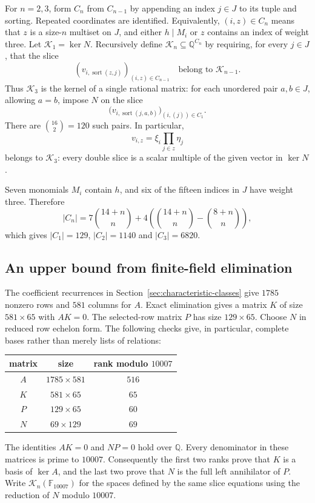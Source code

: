 For $n=2,3$, form $C_n$ from $C_{n-1}$ by appending an index $j\in J$
to its tuple and sorting. Repeated coordinates are identified.
Equivalently, $(i,z)\in C_n$ means that $z$ is a size-$n$ multiset
on $J$, and either $h\mid M_i$ or $z$ contains an index of weight
three. Let $\mathcal K_1=\ker N$. Recursively define
$\mathcal K_n\subseteq\mathbb Q^{C_n}$ by requiring, for every
$j\in J$, that the slice
\[
 (v_{i,\operatorname{sort}(z,j)})_{(i,z)\in C_{n-1}}
 \quad\text{belong to }\mathcal K_{n-1}.
\]
Thus $\mathcal K_3$ is the kernel of a single rational matrix:
for each unordered pair $a,b\in J$, allowing $a=b$, impose $N$ on the slice
\[
 \bigl(v_{i,\operatorname{sort}(j,a,b)}\bigr)_{(i,(j))\in C_1}.
\]
There are $\binom{16}{2}=120$ such pairs. In particular,
\begin{equation}\label{eq:geometric-cubic-column}
 v_{i,z}=\xi_i\prod_{j\in z}\eta_j
\end{equation}
belongs to $\mathcal K_3$: every double slice is a scalar multiple
of the given vector in $\ker N$.

Seven monomials $M_i$ contain $h$, and six of the fifteen indices
in $J$ have weight three. Therefore
\[
 |C_n|=7\binom{14+n}{n}
       +4\left(\binom{14+n}{n}-\binom{8+n}{n}\right),
\]
which gives $|C_1|=129$, $|C_2|=1140$ and $|C_3|=6820$.

\subsection{An upper bound from finite-field elimination}

The coefficient recurrences in Section~\ref{sec:characteristic-classes}
give $1785$ nonzero rows and $581$ columns for $A$. Exact elimination
gives a matrix $K$ of size $581\times65$ with $AK=0$.
The selected-row matrix $P$ has size $129\times65$. Choose $N$ in
reduced row echelon form. The following checks give, in particular,
complete bases rather than merely lists of relations:
\begin{center}
\begin{tabular}{c|c|c}
matrix & size & rank modulo $10007$\\\hline
$A$ & $1785\times581$ & $516$\\
$K$ & $581\times65$ & $65$\\
$P$ & $129\times65$ & $60$\\
$N$ & $69\times129$ & $69$
\end{tabular}
\end{center}
The identities $AK=0$ and $NP=0$ hold over $\mathbb Q$.
Every denominator in these matrices is prime to $10007$.
Consequently the first two ranks prove that $K$ is a basis of
$\ker A$, and the last two prove that $N$ is the full left
annihilator of $P$.
Write $\mathcal K_n(\mathbb F_{10007})$ for the spaces defined
by the same slice equations using the reduction of $N$ modulo
$10007$.

